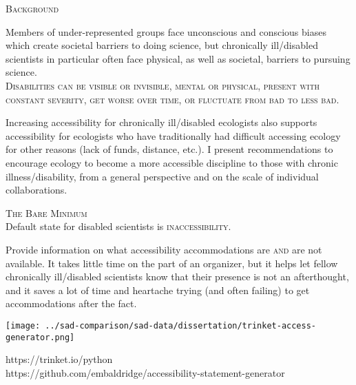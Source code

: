 \documentclass{beamer}
\begin{document}
\begin{minipage}{0.25\linewidth}
\hspace{0.5cm}
\begin{Large}
\begin{center}
\textsc{Background}
\end{center}
\end{Large}
Members of under-represented groups face unconscious and conscious biases which create societal barriers to doing science, but chronically ill/disabled scientists in particular often face physical, as well as societal, barriers to pursuing science.\\ 

\textsc{Disabilities can be visible or invisible, mental or physical, present with constant severity, get worse over time, or fluctuate from bad to less bad.\\ } 

Increasing accessibility for chronically ill/disabled ecologists also supports accessibility for ecologists who have traditionally had difficult accessing ecology for other reasons (lack of funds, distance, etc.). I present recommendations to encourage ecology to become a more accessible discipline to those with chronic illness/disability, from a general perspective and on the scale of individual collaborations. \\

\begin{Large}
\begin{center}
\textsc{The Bare Minimum}
\\Default state for disabled scientists is \textsc{inaccessibility}.
\end{center}
\end{Large}
Provide information on what accessibility accommodations are \textsc{and} are not available.  It takes little time on the part of an organizer, but it helps let fellow chronically ill/disabled scientists know that their presence is not an afterthought, and it saves a lot of time and heartache trying (and often failing) to get accommodations after the fact.
\begin{center}
\texttt{[image: ../sad-comparison/sad-data/dissertation/trinket-access-generator.png]}\\
\end{center}
https://trinket.io/python\\
https://github.com/embaldridge/accessibility-statement-generator\\
\end{minipage}
\end{document}
